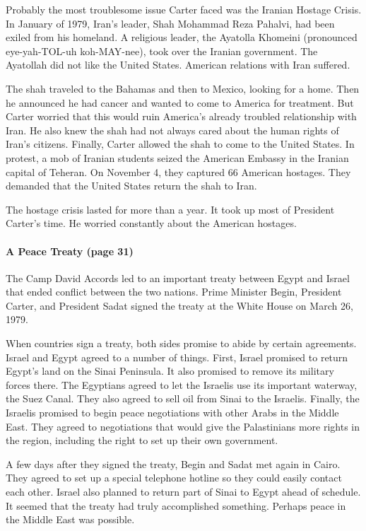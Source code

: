 \documentclass{article}
\begin{document}
Probably the most troublesome issue Carter faced was the Iranian Hostage Crisis. In January of 1979, Iran's leader, Shah Mohammad Reza Pahalvi, had been exiled from his homeland. A religious leader, the Ayatolla Khomeini (pronounced eye-yah-TOL-uh koh-MAY-nee), took over the Iranian government. The Ayatollah did not like the United States. American relations with Iran suffered.

The shah traveled to the Bahamas and then to Mexico, looking for a home. Then he announced he had cancer and wanted to come to America for treatment. But Carter worried that this would ruin America's already troubled relationship with Iran. He also knew the shah had not always cared about the human rights of Iran's citizens. Finally, Carter allowed the shah to come to the United States. In protest, a mob of Iranian students seized the American Embassy in the Iranian capital of Teheran. On November 4, they captured 66 American hostages. They demanded that the United States return the shah to Iran.

The hostage crisis lasted for more than a year. It took up most of President Carter's time. He worried constantly about the American hostages.

\paragraph{A Peace Treaty (page 31)}
The Camp David Accords led to an important treaty between Egypt and Israel that ended conflict between the two nations. Prime Minister Begin, President Carter, and President Sadat signed the treaty at the White House on March 26, 1979. 

When countries sign a treaty, both sides promise to abide by certain agreements. Israel and Egypt agreed to a number of things. First, Israel promised to return Egypt's land on the Sinai Peninsula. It also promised to remove its military forces there. The Egyptians agreed to let the Israelis use its important waterway, the Suez Canal. They also agreed to sell oil from Sinai to the Israelis. Finally, the Israelis promised to begin peace negotiations with other Arabs in the Middle East. They agreed to negotiations that would give the Palastinians more rights in the region, including the right to set up their own government.

A few days after they signed the treaty, Begin and Sadat met again in Cairo. They agreed to set up a special telephone hotline so they could easily contact each other. Israel also planned to return part of Sinai to Egypt ahead of schedule. It seemed that the treaty had truly accomplished something. Perhaps peace in the Middle East was possible.
\end{document}
